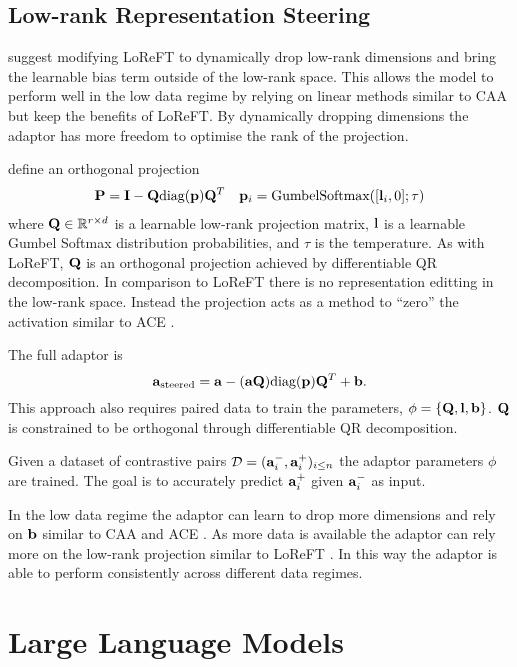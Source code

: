 \subsection{Low-rank Representation Steering}
\label{lorest}

\citet{steering-clear} suggest modifying LoReFT \citep{reft} to dynamically drop low-rank dimensions and bring the learnable bias term outside of the low-rank space.
This allows the model to perform well in the low data regime by relying on linear methods similar to CAA \citep{caa} but keep the benefits of LoReFT.
By dynamically dropping dimensions the adaptor has more freedom to optimise the rank of the projection.

\citet{steering-clear} define an orthogonal projection
\begin{align*}
    \mathbf{P} = \mathbf{I} - \mathbf{Q}\text{diag}(\mathbf{p})\mathbf{Q}^T && \mathbf{p}_i = \text{GumbelSoftmax}([\mathbf{l}_i,0];\tau)
\end{align*}
where $\mathbf{Q} \in \mathbb{R}^{r\times d}$ is a learnable low-rank projection matrix, $\mathbf{l}$ is a learnable Gumbel Softmax distribution probabilities, and $\tau$ is the temperature.
As with LoReFT, $\mathbf{Q}$ is an orthogonal projection achieved by differentiable QR decomposition.
In comparison to LoReFT  there is no representation editting in the low-rank space.
Instead the projection acts as a method to ``zero'' the activation similar to ACE \citep{ace}.

The full adaptor is
\begin{equation}
    \mathbf{a}_\text{steered} = \mathbf{a} - (\mathbf{a}\mathbf{Q})\text{diag}(\mathbf{p})\mathbf{Q}^T + \mathbf{b}.
\end{equation}
This approach also requires paired data to train the parameters, $\phi = \{\mathbf{Q}, \mathbf{l}, \mathbf{b}\}$.
$\mathbf{Q}$ is constrained to be orthogonal through differentiable QR decomposition.

Given a dataset of contrastive pairs $\mathcal{D} = (\mathbf{a}_i^-, \mathbf{a}_i^+)_{i\le n}$ the adaptor parameters $\phi$ are trained.
The goal is to accurately predict $\mathbf{a}_i^+$ given $\mathbf{a}_i^-$ as input.

In the low data regime the adaptor can learn to drop more dimensions and rely on $\mathbf{b}$ similar to CAA \citep{caa} and ACE \citep{ace}.
As more data is available the adaptor can rely more on the low-rank projection similar to LoReFT \citep{reft}.
In this way the adaptor is able to perform consistently across different data regimes.

\section{Large Language Models}

